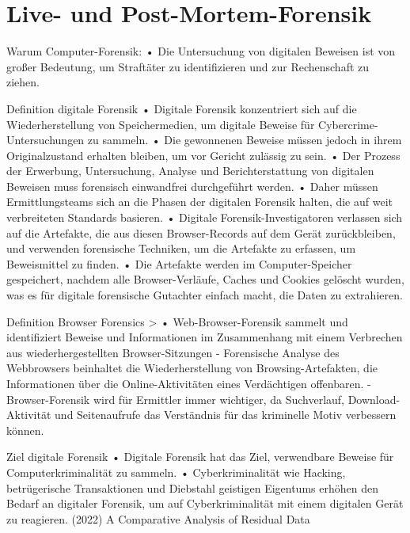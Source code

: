 \section{Live- und Post-Mortem-Forensik}

Warum Computer-Forensik: \cite{Mahlous.2020}
	•	Die Untersuchung von digitalen Beweisen ist von großer Bedeutung, um Straftäter zu identifizieren und zur Rechenschaft zu ziehen.


Definition digitale Forensik \cite{Izzati.2022}
	•	Digitale Forensik konzentriert sich auf die Wiederherstellung von Speichermedien, um digitale Beweise für Cybercrime-Untersuchungen zu sammeln.
	•	Die gewonnenen Beweise müssen jedoch in ihrem Originalzustand erhalten bleiben, um vor Gericht zulässig zu sein.
	•	Der Prozess der Erwerbung, Untersuchung, Analyse und Berichterstattung von digitalen Beweisen muss forensisch einwandfrei durchgeführt werden.
	•	Daher müssen Ermittlungsteams sich an die Phasen der digitalen Forensik halten, die auf weit verbreiteten Standards basieren.
	•	Digitale Forensik-Investigatoren verlassen sich auf die Artefakte, die aus diesen Browser-Records auf dem Gerät zurückbleiben, und verwenden forensische Techniken, um die Artefakte zu erfassen, um Beweismittel zu finden.
	•	Die Artefakte werden im Computer-Speicher gespeichert, nachdem alle Browser-Verläufe, Caches und Cookies gelöscht wurden, was es für digitale forensische Gutachter einfach macht, die Daten zu extrahieren.


Definition Browser Forensics
	> \cite{Mahlous.2020} 
		•	Web-Browser-Forensik sammelt und identifiziert Beweise und Informationen im Zusammenhang mit einem Verbrechen aus wiederhergestellten Browser-Sitzungen
		-	Forensische Analyse des Webbrowsers beinhaltet die Wiederherstellung von Browsing-Artefakten, die Informationen über die Online-Aktivitäten eines Verdächtigen offenbaren.
		-	Browser-Forensik wird für Ermittler immer wichtiger, da Suchverlauf, Download-Aktivität und Seitenaufrufe das Verständnis für das kriminelle Motiv verbessern können.
		
Ziel digitale Forensik \cite{Izzati.2022}
	•	Digitale Forensik hat das Ziel, verwendbare Beweise für Computerkriminalität zu sammeln.
	•	Cyberkriminalität wie Hacking, betrügerische Transaktionen und Diebstahl geistigen Eigentums erhöhen den Bedarf an digitaler Forensik, um auf Cyberkriminalität mit einem digitalen Gerät zu reagieren. (2022) A Comparative Analysis of Residual Data



